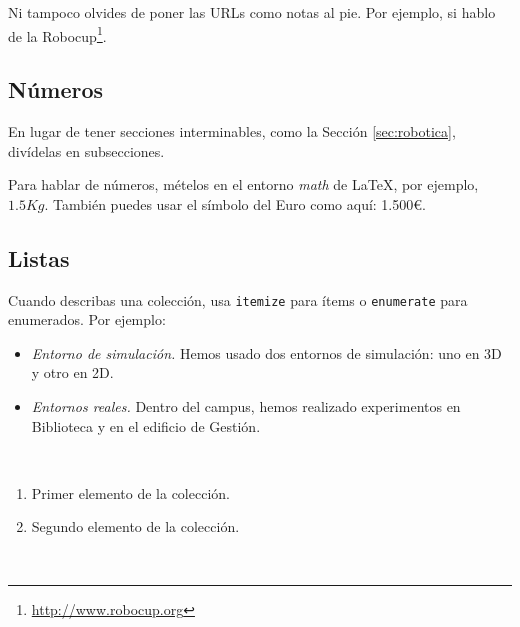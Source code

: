 			Ni tampoco olvides de poner las URLs como notas al pie. Por ejemplo, si hablo de la Robocup\footnote{\url{http://www.robocup.org}}.
			
			\subsection{Números}
			\label{sec:subseccion}
			
			En lugar de tener secciones interminables, como la Sección \ref{sec:robotica}, divídelas en subsecciones.
			
			Para hablar de números, mételos en el entorno \textit{math} de \LaTeX, por ejemplo, $1.5Kg$. También puedes usar el símbolo del Euro como aquí: 1.500\euro.
			
			\subsection{Listas}
			
			Cuando describas una colección, usa \texttt{itemize} para ítems o \texttt{enumerate} para enumerados. Por ejemplo:
			
			\begin{itemize}
				\item \textit{Entorno de simulación.} Hemos usado dos entornos de simulación: uno en 3D y otro en 2D.
				\item \textit{Entornos reales.} Dentro del campus, hemos realizado experimentos en Biblioteca y en el edificio de Gestión.
			\end{itemize}\
			
			\begin{enumerate}
				\item Primer elemento de la colección.
				\item Segundo elemento de la colección.
			\end{enumerate}\
			

